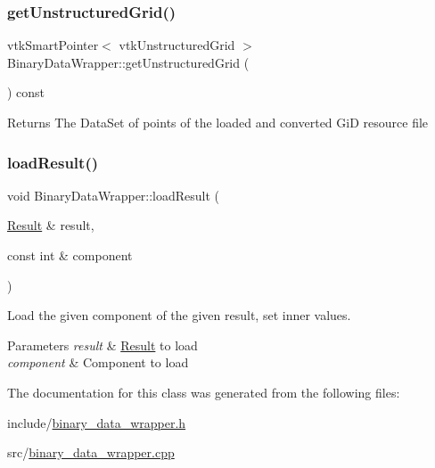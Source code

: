 \subsubsection{\texorpdfstring{get\+Unstructured\+Grid()}{getUnstructuredGrid()}}
{\footnotesize\ttfamily vtk\+Smart\+Pointer$<$ vtk\+Unstructured\+Grid $>$ Binary\+Data\+Wrapper\+::get\+Unstructured\+Grid (\begin{DoxyParamCaption}{ }\end{DoxyParamCaption}) const}

\begin{DoxyReturn}{Returns}
The Data\+Set of points of the loaded and converted GiD resource file 
\end{DoxyReturn}
\mbox{\label{classBinaryDataWrapper_a1cbd933061a05f42ca7ab95cbc951c98}} 
\subsubsection{\texorpdfstring{load\+Result()}{loadResult()}}
{\footnotesize\ttfamily void Binary\+Data\+Wrapper\+::load\+Result (\begin{DoxyParamCaption}\item[{\hyperlink{classResult}{Result} \&}]{result,  }\item[{const int \&}]{component }\end{DoxyParamCaption})}



Load the given component of the given result, set inner values. 


\begin{DoxyParams}{Parameters}
{\em result} & \hyperlink{classResult}{Result} to load \\
\hline
{\em component} & Component to load \\
\hline
\end{DoxyParams}


The documentation for this class was generated from the following files\+:\begin{DoxyCompactItemize}
\item 
include/\hyperlink{binary__data__wrapper_8h}{binary\+\_\+data\+\_\+wrapper.\+h}\item 
src/\hyperlink{binary__data__wrapper_8cpp}{binary\+\_\+data\+\_\+wrapper.\+cpp}\end{DoxyCompactItemize}
